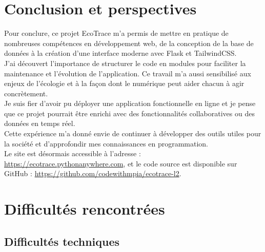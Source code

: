 \documentclass[a4paper,11pt]{article}
\begin{document}
    \newpage
    \section{Conclusion et perspectives}
        \begin{tcolorbox}[colback=lightgray!6, colframe=black, left=2mm, right=5mm, top=2mm, bottom=0mm, boxrule=0.1mm]
            Pour conclure, ce projet EcoTrace m’a permis de mettre en pratique de nombreuses compétences en développement web, de la conception de la base de données à la création d’une interface moderne avec Flask et TailwindCSS.\\

            J’ai découvert l’importance de structurer le code en modules pour faciliter la maintenance et l’évolution de l’application. Ce travail m’a aussi sensibilisé aux enjeux de l’écologie et à la façon dont le numérique peut aider chacun à agir concrètement.\\

            Je suis fier d’avoir pu déployer une application fonctionnelle en ligne et je pense que ce projet pourrait être enrichi avec des fonctionnalités collaboratives ou des données en temps réel.\\

            Cette expérience m’a donné envie de continuer à développer des outils utiles pour la société et d’approfondir mes connaissances en programmation.\\

            Le site est désormais accessible à l'adresse : \url{https://ecotrace.pythonanywhere.com}, et le code source est disponible sur GitHub : \url{https://github.com/codewithmpia/ecotrace-l2}.
        \end{tcolorbox}

    \newpage
    \section{Difficultés rencontrées}
        \subsection{Difficultés techniques}
\end{document}
